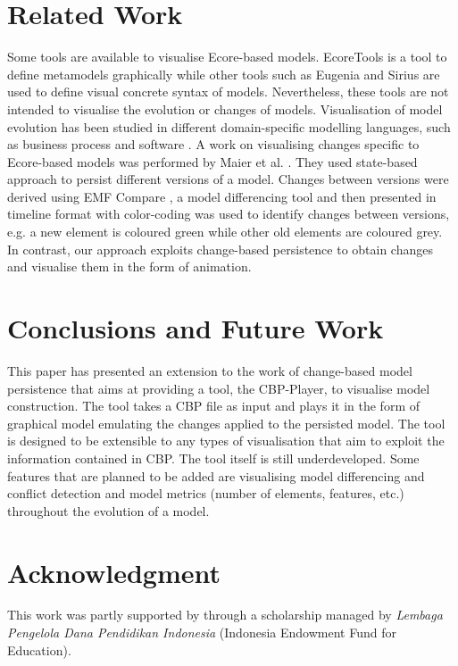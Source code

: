 \documentclass[conference]{IEEEtran}
\begin{document}
\section{Related Work}
\label{sec:related_work}
Some tools are available to visualise Ecore-based models. 
EcoreTools \cite{eclipse2019ecoretools} is a tool to define metamodels graphically while other tools such as
Eugenia \cite{Kolovos2017} and Sirius \cite{eclipse2019sirius} are used 
to define visual concrete syntax of models.
Nevertheless, these tools are not intended to visualise the evolution or changes of models. 
Visualisation of model evolution has been studied in different domain-specific
modelling languages, such as business process \cite{fritscher2014visualizing}
and software \cite{Mattila:2016:SVT:2994310.2994327}. A work on visualising changes specific to Ecore-based models 
was performed by Maier et al. \cite{maier2015recording}. 
They used state-based approach to persist different versions of a model.
Changes between versions were derived using EMF Compare \cite{eclipse2017compare}, 
a model differencing tool and then presented 
in timeline format with color-coding was used 
to identify changes between versions, e.g. a new element is coloured green
while other old elements are coloured grey. In contrast, our approach
exploits change-based persistence to obtain changes and visualise them in
the form of animation.



\section{Conclusions and Future Work}
\label{sec:conclusions_and_future_work}
This paper has presented an extension to the work of change-based model persistence
that aims at providing a tool, the CBP-Player, to visualise model construction. 
The tool takes a CBP file as input and plays it in the form of graphical model
emulating the changes applied to the persisted model. 
The tool is designed to be extensible to any types of visualisation that aim
to exploit the information contained in CBP. The tool itself is still underdeveloped. 
Some features that are planned to be added are visualising model differencing
and conflict detection and model metrics 
(number of elements, features, etc.) throughout the evolution of a model.



\section*{Acknowledgment}
This work was partly supported by through a scholarship managed by \emph{Lembaga Pengelola Dana Pendidikan Indonesia} (Indonesia Endowment Fund for Education).



\end{document}
